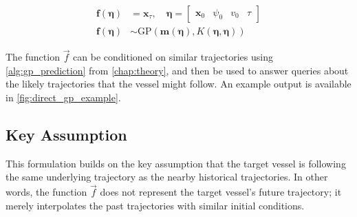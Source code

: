\begin{subequations}\label{eq:gp_direct}
    \begin{align}
        \boldsymbol{f}(\boldsymbol{\eta}) & = \boldsymbol{x}_{\tau} \label{eq:gp_direct_f}, \quad \boldsymbol{\eta} = \begin{bmatrix} \boldsymbol{x}_0 & \psi_0 & v_0 & \tau\end{bmatrix}                   \\
        \boldsymbol{f}(\boldsymbol{\eta}) & \sim \text{GP}(\boldsymbol{m}(\boldsymbol{\eta}), K(\boldsymbol{\eta}, \boldsymbol{\eta}))\label{eq:gp_direct_f_dist}
    \end{align}
\end{subequations}

The function $\vec{f}$ can be conditioned on similar trajectories using \cref{alg:gp_prediction} from \cref{chap:theory}, and then be used to answer queries about the likely trajectories that the vessel might follow. An example output is available in \cref{fig:direct_gp_example}.

\subsection{Key Assumption}
This formulation builds on the key assumption that the target vessel is following the same underlying trajectory as the nearby historical trajectories. In other words, the function $\vec{f}$ does not represent the target vessel's future trajectory; it merely interpolates the past trajectories with similar initial conditions. 



